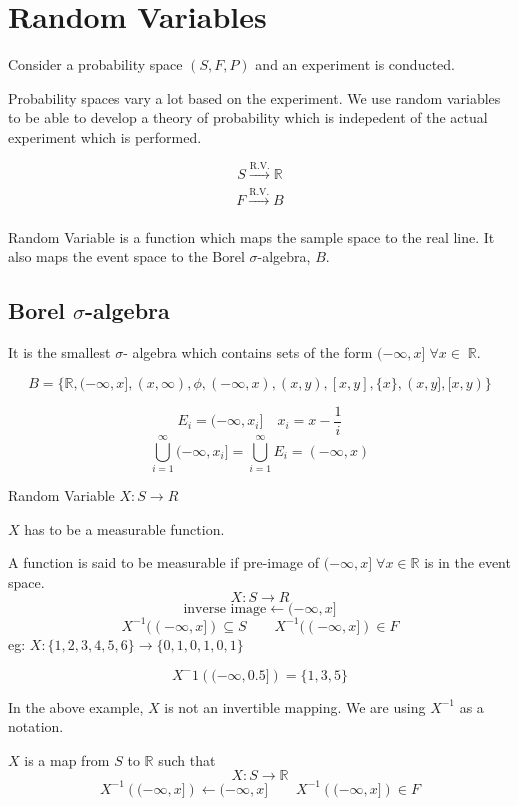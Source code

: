 \documentclass{article}
\begin{document}
\section{Random Variables}

Consider a probability space $(S,F,P)$ and an experiment is conducted.

Probability spaces vary a lot based on the experiment. We use random variables to be able to develop a theory of probability which is indepedent of the actual experiment which is performed.

$$S \xrightarrow[]{\text{R.V.}} \mathbb{R}$$
$$F \xrightarrow[]{\text{R.V.}} B$$

Random Variable is a function which maps the sample space to the real line.
It also maps the event space to the Borel $\sigma$-algebra, $B$.

\subsection{Borel $\sigma$-algebra}
It is the smallest $\sigma$- algebra which contains sets of the form $(-\infty ,x]\; \forall x \in \; \mathbb{R}$.

$$ B=\{ \mathbb{R} , (-\infty ,x] ,(x,\infty ), \phi, (-\infty,x) ,(x,y),[x,y], \{x\},(x,y],[x,y)\}$$

$$ E_i =(-\infty ,x_i] \quad x_i = x-\frac{1}{i}$$
$$ \bigcup_{i=1}^{\infty}(-\infty ,x_i] = \bigcup_{i=1}^{\infty} E_i =(-\infty ,x)$$


Random Variable $X:S \rightarrow R$

$X$ has to be a measurable function.

A function is said to be measurable if  pre-image of $(-\infty ,x ] \; \forall x \in \mathbb{R}$ is in the event space.
$$X:S \rightarrow R$$
$$\text{inverse image} \leftarrow(-\infty ,x ] $$
$$ X^{-1} ((-\infty ,x ]) \subseteq S \qquad  X^{-1} ((-\infty ,x ]) \in F$$
eg:
$ X: \{1,2,3,4,5,6\} \rightarrow \{0,1,0,1,0,1 \}$

$$X^-1\left( (-\infty, 0.5]\right)=\{1,3,5\}$$

In the above example, $X$ is not an invertible mapping. We are using $X^{-1}$ as a notation.

$X$ is a map from $S$ to $\mathbb{R}$ such that
$$X:S \rightarrow \mathbb{R}$$
$$ X^{-1}\left( (-\infty, x ]\right) \leftarrow (-\infty, x ] \qquad X^{-1}\left( (-\infty, x ]\right) \in F $$
\end{document}
